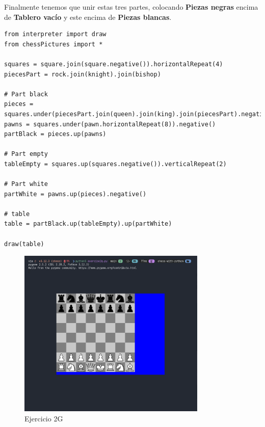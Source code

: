 \documentclass[10pt, a4paper]{article}
\begin{document}
Finalmente tenemos que unir estas tres partes, colocando \textbf{Piezas negras} encima de \textbf{Tablero vacío} y este encima de \textbf{Piezas blancas}.

\begin{verbatim}
from interpreter import draw
from chessPictures import *

squares = square.join(square.negative()).horizontalRepeat(4)
piecesPart = rock.join(knight).join(bishop)

# Part black
pieces = squares.under(piecesPart.join(queen).join(king).join(piecesPart).negative())
pawns = squares.under(pawn.horizontalRepeat(8)).negative()
partBlack = pieces.up(pawns)

# Part empty
tableEmpty = squares.up(squares.negative()).verticalRepeat(2)

# Part white
partWhite = pawns.up(pieces).negative()

# table
table = partBlack.up(tableEmpty).up(partWhite)

draw(table)
\end{verbatim}

\begin{figure}[H]
  \centering
  \includegraphics[width=0.8\textwidth]{img/exercise2g.png}
  \caption{Ejercicio 2G}
\end{figure}
\end{document}
